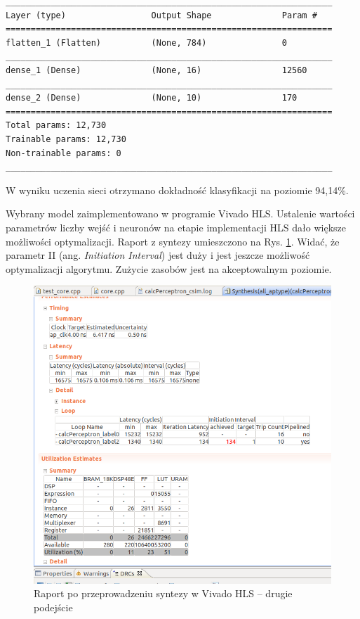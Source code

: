 \begin{verbatim}
_________________________________________________________________
Layer (type)                 Output Shape              Param #   
=================================================================
flatten_1 (Flatten)          (None, 784)               0         
_________________________________________________________________
dense_1 (Dense)              (None, 16)                12560     
_________________________________________________________________
dense_2 (Dense)              (None, 10)                170       
=================================================================
Total params: 12,730
Trainable params: 12,730
Non-trainable params: 0
_________________________________________________________________
\end{verbatim}

W wyniku uczenia sieci otrzymano dokładność klasyfikacji na poziomie 94,14\%.

Wybrany model zaimplementowano w programie Vivado HLS. Ustalenie wartości parametrów liczby wejść i neuronów na etapie implementacji HLS dało większe możliwości optymalizacji. Raport z syntezy umieszczono na Rys. \ref{hls-report2}. Widać, że parametr II (ang. \emph{Initiation Interval}) jest duży i jest jeszcze możliwość optymalizacji algorytmu. Zużycie zasobów jest na akceptowalnym poziomie.

\begin{figure}[!h]
  \centering
  \includegraphics[width=\textwidth]{img/hls-report2.png}
  \caption{Raport po przeprowadzeniu syntezy w Vivado HLS -- drugie podejście}
  \label{hls-report2}
\end{figure}

